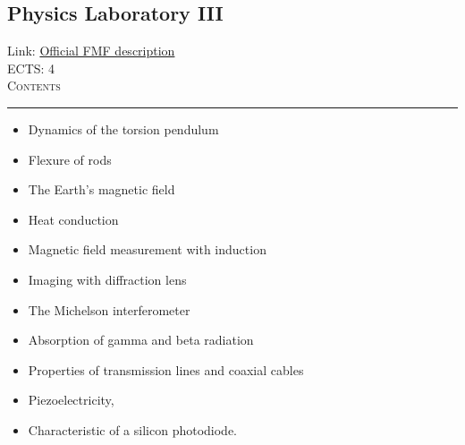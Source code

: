 \documentclass[11pt, a4paper]{article}
\newenvironment{course}[3]{
\subsection{#1}%
Link: \href{#2}{Official FMF description}\\%
ECTS: #3%
\vspace{1ex}
\\
{\large \textsc{Contents}}\\[-0.9ex]%
\rule{\textwidth}{0.5pt}
\vspace{-3ex}
}
{}
\newenvironment{chapter}[1]{
\begin{tcolorbox}[title=#1, breakable]
}
{\end{tcolorbox}}
\begin{document}
\begin{course}{Physics Laboratory III}{https://www.fmf.uni-lj.si/en/study-physics/programmes/1fiz/2020/7000777/courses/1144/}{4}
    \label{physics_laboratory_3}

    \begin{chapter}{Experiments}
        \begin{itemize}
        
            \item Dynamics of the torsion pendulum

            \item Flexure of rods

            \item The Earth's magnetic field

            \item Heat conduction

            \item Magnetic field measurement with induction

            \item Imaging with diffraction lens

            \item The Michelson interferometer

            \item Absorption of gamma and beta radiation

            \item Properties of transmission lines and coaxial cables

            \item Piezoelectricity, 

            \item Characteristic of a silicon photodiode.        
        
        \end{itemize}
    \end{chapter}

\end{course}
\end{document}
